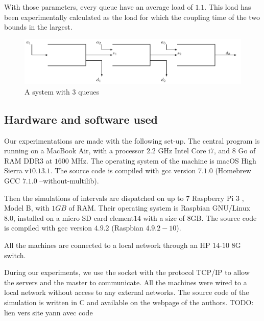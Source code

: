 \documentclass[a4paper,10pt]{article}
\newcommand{\todo}[1]{{\color{red} TODO: {#1}}}
\begin{document}
With those parameters, every queue have an average load of $1.1$. This load has been experimentally calculated as the load for which the coupling time of the two bounds in the largest.

\begin{figure}[h]
 \includegraphics[scale=0.75]{tandem.pdf}
 \caption{A system with 3 queues}
\end{figure}

\subsection{Hardware and software used}

Our experimentations are made with the following set-up.
The central program is running on a MacBook Air, with a processor $2.2$ GHz Intel Core i$7$, and $8$ Go of RAM DDR$3$ at $1600$ MHz. The operating system of the machine is macOS High Sierra v$10.13.1$. The source code is compiled with  gcc version $7.1.0$ (Homebrew GCC $7.1.0$ --without-multilib).

Then the simulations of intervals are dispatched on up to $7$ Raspberry Pi 3 , Model B, with $1GB$ of RAM. Their operating system is  Raspbian GNU/Linux $8.0$, installed on a micro SD card element$14$ with a size of $8$GB. The source code is compiled with gcc version $4.9.2$ (Raspbian $4.9.2-10$).

All the machines are connected to a local network through an HP $14$-$10$ $8$G switch. 

During our experiments, we use the socket with the protocol TCP/IP to allow the servers and the master to communicate. All the machines were wired to a local network without access to any external networks. The source code of the simulation is written in C and available on the webpage of the authors. 
\todo{lien vers site yann avec code}
\end{document}
